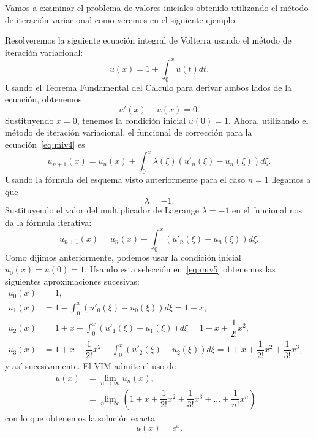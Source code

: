 Vamos a examinar el problema de valores iniciales obtenido utilizando el método de iteración variacional como veremos en el siguiente ejemplo:
\begin{ejemplo}
	Resolveremos la siguiente ecuación integral de Volterra usando el método de iteración variacional:
	\begin{equation}
		u(x) = 1 + \int_{0}^{x}u(t)dt.
	\end{equation}
	Usando el Teorema Fundamental del Cálculo para derivar ambos lados de la ecuación, obtenemos
	\begin{equation}\label{eq:miv4}
		u'(x) - u(x) = 0.
	\end{equation}
	Sustituyendo $x = 0$, tenemos la condición inicial $u(0) = 1.$ Ahora, utilizando el método de iteración variacional, el funcional de corrección para la ecuación~\eqref{eq:miv4} es
	\begin{equation}\label{eq:miv5}
		u_{n+1}(x) = u_n(x) + \int_{0}^{x} \lambda (\xi) (u'_n(\xi) - \tilde{u}_n(\xi))d\xi.
	\end{equation}
	Usando la fórmula del esquema visto anteriormente para el caso $n = 1$ llegamos a que 
	\begin{equation}
		\lambda = -1.
	\end{equation}
	Sustituyendo el valor del multiplicador de Lagrange $\lambda = -1$ en el funcional nos da la fórmula iterativa:
	\begin{equation}
		u_{n+1}(x) = u_n(x) - \int_{0}^{x} (u'_n(\xi) - u_n(\xi))d\xi.
	\end{equation}
	Como dijimos anteriormente, podemos usar la condición inicial $u_0(x) = u(0) = 1.$ Usando esta selección en~\eqref{eq:miv5} obtenemos las siguientes aproximaciones sucesivas:
	\begin{align}
		u_0(x) &= 1,      &   \\
		u_1(x) &= 1 - \int_{0}^{x} (u'_0(\xi) - u_0(\xi))d\xi = 1 + x,    & \\
		u_2(x) &= 1 + x - \int_{0}^{x} (u'_1(\xi) - u_1(\xi))d\xi = 1 + x + \dfrac{1}{2!}x^2,    & \\
		u_3(x) &= 1 + x + \dfrac{1}{2!}x^2 - \int_{0}^{x} (u'_2(\xi) - u_2(\xi))d\xi = 1 + x + \dfrac{1}{2!}x^2 + \dfrac{1}{3!}x^3,    &
	\end{align}
	y así sucesivamente. El VIM admite el uso de 
	\begin{align}
		u(x) &= \lim_{n \rightarrow \infty} u_n(x),      &   \\
		&= \lim_{n \rightarrow \infty} (1 + x + \dfrac{1}{2!}x^2 + \dfrac{1}{3!}x^3 + ... + \dfrac{1}{n!}x^n)
	\end{align}
	con lo que obtenemos la solución exacta
	\begin{equation}
		u(x) = e^x.
	\end{equation}
\end{ejemplo}

